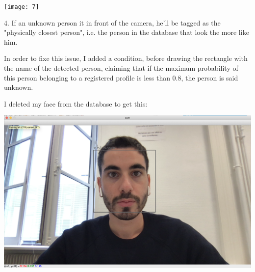 \documentclass{article}
\begin{document}
\begin{center}
	\texttt{[image: 7]}
\end{center}

4. If an unknown person it in front of the camera, he'll be tagged as the "physically closest person", i.e. the person in the database that look the more like him.

In order to fixe this issue, I added a condition, before drawing the rectangle with the name of the detected person, claiming that if the maximum probability of this person belonging to a registered profile is less than 0.8, the person is said unknown.

I deleted my face from the database to get this:
\begin{center}
	\includegraphics[scale=0.15]{8}
\end{center}
\end{document}
